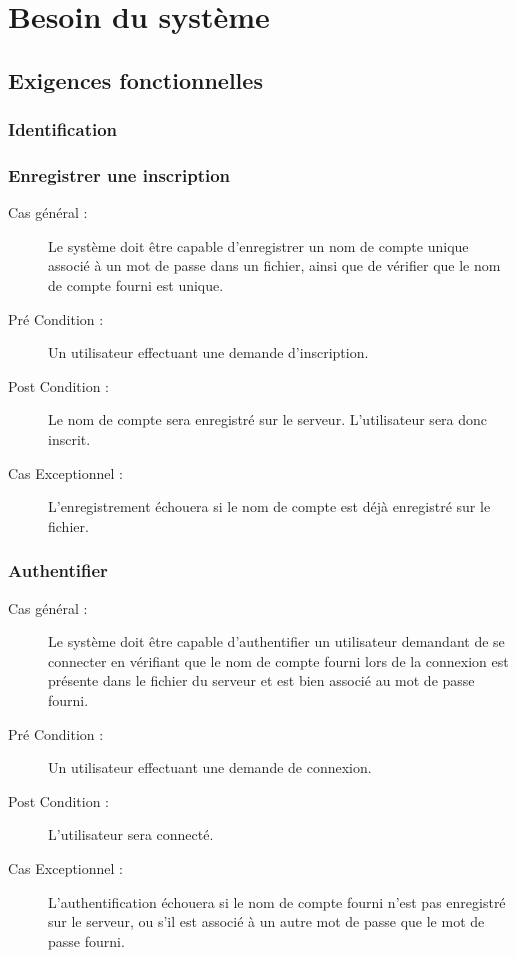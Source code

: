 \documentclass[a4paper]{report}
\begin{document}

\chapter{Besoin du système}
\section{Exigences fonctionnelles}

\subsection{Identification}
\subsection{Enregistrer une inscription}
\begin{description}
    \item[Cas général :] Le système doit être capable d'enregistrer un nom de compte unique associé à un mot de passe dans un fichier, ainsi que de vérifier que le nom de compte fourni est unique.
    \item[Pré Condition  :] Un \gls{utilisateur} effectuant une demande d'inscription.
    \item[Post Condition :] Le nom de compte sera enregistré sur le \gls{serveur}. L'\gls{utilisateur} sera donc inscrit.
    \item[Cas Exceptionnel :] L'enregistrement échouera si le nom de compte est déjà enregistré sur le fichier.
\end{description}

\subsection{Authentifier}
\begin{description}
    \item[Cas général :] Le système doit être capable d'authentifier un \gls{utilisateur} demandant de se connecter en vérifiant que le nom de compte fourni lors de la connexion est présente dans le fichier du \gls{serveur} et est bien associé au mot de passe fourni.
    \item[Pré Condition  :] Un \gls{utilisateur} effectuant une demande de connexion.
    \item[Post Condition :] L'\gls{utilisateur} sera connecté.
    \item[Cas Exceptionnel :] L'authentification échouera si le nom de compte fourni n'est pas enregistré sur le \gls{serveur}, ou s'il est associé à un autre mot de passe que le mot de passe fourni.
\end{description}
\end{document}
